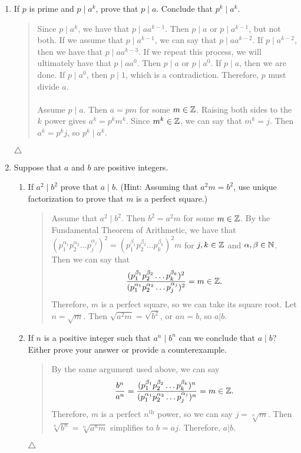\documentclass{hw}
\begin{document}

\begin{enumerate}
\item If $p$ is prime and $p\mid a^k$, prove that $p\mid a$. Conclude that $p^k\mid a^k$.
\begin{quote}
Since $p\mid a^k$, we have that $p\mid aa^{k-1}$. Then $p\mid a$ or $p\mid a^{k-1}$, but not
both. If we assume that $p\mid a^{k-1}$, we can say that $p\mid aa^{k-2}$. If $p\mid a^{k-2}$, then we have
that $p\mid aa^{k-3}$. If we repeat this process, we will ultimately have that $p\mid aa^0$. Then $p\mid a$
or $p\mid a^0$. If $p\mid a$, then we are done. If $p\mid a^0$, then $p\mid 1$, which
is a contradiction. Therefore, $p$ must divide $a$.\\\\
Assume $p\mid a$. Then $a=pm$ for some $m\in\mathbb{Z}$. Raising both sides to the $k$ power gives $a^k=p^km^k$.
Since $m^k\in\mathbb{Z}$, we can say that $m^k=j$. Then $a^k=p^kj$, so $p^k\mid a^k$.
\end{quote}
$\triangle$



\item Suppose that $a$ and $b$ are positive integers.
\begin{enumerate}
\item If $a^2\mid b^2$ prove that $a\mid b$. (Hint: Assuming that $a^2m = b^2$, use unique factorization to
prove that $m$ is a perfect square.)
\begin{quote}
Assume that $a^2\mid b^2$. Then $b^2=a^2m$ for some $m\in\mathbb{Z}$. By the Fundamental Theorem of Arithmetic,
we have that
$(p_{1}^{\alpha_1}p_{2}^{\alpha_2}\dots p_{j}^{\alpha_j})^2 =
(p_{1}^{\beta_1}p_{2}^{\beta_2}\dots p_{k}^{\beta_k})^2m$ for $j,k\in\mathbb{Z}$ and $\alpha,\beta\in\mathbb{N}$.
Then we can say that
\[
{
(p_{1}^{\beta_1}p_{2}^{\beta_2}\dots p_{k}^{\beta_k})^2
\over
(p_{1}^{\alpha_1}p_{2}^{\alpha_2}\dots p_{j}^{\alpha_j})^2
}
= m\in\mathbb{Z}.
\]
Therefore, $m$ is a perfect square, so we can take its square root. Let $n=\sqrt{m}$. Then
$\sqrt{a^2m}=\sqrt{b^2}$, or $an=b$, so $a|b$.
\end{quote}

\item If $n$ is a positive integer such that $a^n \mid b^n$ can we conclude that $a \mid b$? Either prove
your answer or provide a counterexample.
\begin{quote}
By the same argument used above, we can say
\[
{b^n\over a^n} =
{
(p_{1}^{\beta_1}p_{2}^{\beta_2}\dots p_{k}^{\beta_k})^n
\over
(p_{1}^{\alpha_1}p_{2}^{\alpha_2}\dots p_{j}^{\alpha_j})^n
}
= m\in\mathbb{Z}.
\]
Therefore, $m$ is a perfect $n^{\text{th}}$ power, so we can say $j=\sqrt[n]{m}$. Then
$\sqrt[n]{b^n}=\sqrt[n]{a^nm}$ simplifies to $b=aj$. Therefore, $a|b$.
\end{quote}
$\triangle$
\end{enumerate}




\end{enumerate}
\end{document}
